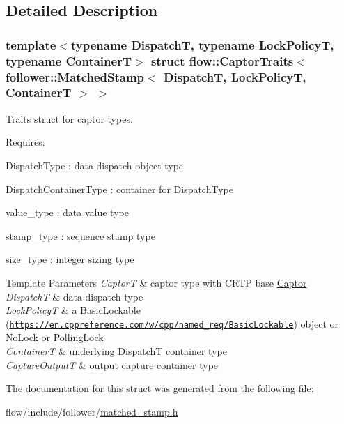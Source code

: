 \subsection{Detailed Description}
\subsubsection*{template$<$typename DispatchT, typename Lock\+PolicyT, typename ContainerT$>$\newline
struct flow\+::\+Captor\+Traits$<$ follower\+::\+Matched\+Stamp$<$ Dispatch\+T, Lock\+Policy\+T, Container\+T $>$ $>$}

Traits struct for captor types. 

Requires\+:
\begin{DoxyItemize}
\item {\ttfamily Dispatch\+Type} \+: data dispatch object type
\item {\ttfamily Dispatch\+Container\+Type} \+: container for {\ttfamily Dispatch\+Type}
\item {\ttfamily value\+\_\+type} \+: data value type
\item {\ttfamily stamp\+\_\+type} \+: sequence stamp type
\item {\ttfamily size\+\_\+type} \+: integer sizing type
\end{DoxyItemize}


\begin{DoxyTemplParams}{Template Parameters}
{\em CaptorT} & captor type with C\+R\+TP base {\ttfamily \hyperlink{classflow_1_1_captor}{Captor}}\\
\hline
{\em DispatchT} & data dispatch type \\
\hline
{\em Lock\+PolicyT} & a Basic\+Lockable (\href{https://en.cppreference.com/w/cpp/named_req/BasicLockable}{\tt https\+://en.\+cppreference.\+com/w/cpp/named\+\_\+req/\+Basic\+Lockable}) object or \hyperlink{structflow_1_1_no_lock}{No\+Lock} or \hyperlink{structflow_1_1_polling_lock}{Polling\+Lock} \\
\hline
{\em ContainerT} & underlying {\ttfamily DispatchT} container type \\
\hline
{\em Capture\+OutputT} & output capture container type \\
\hline
\end{DoxyTemplParams}


The documentation for this struct was generated from the following file\+:\begin{DoxyCompactItemize}
\item 
flow/include/follower/\hyperlink{matched__stamp_8h}{matched\+\_\+stamp.\+h}\end{DoxyCompactItemize}
